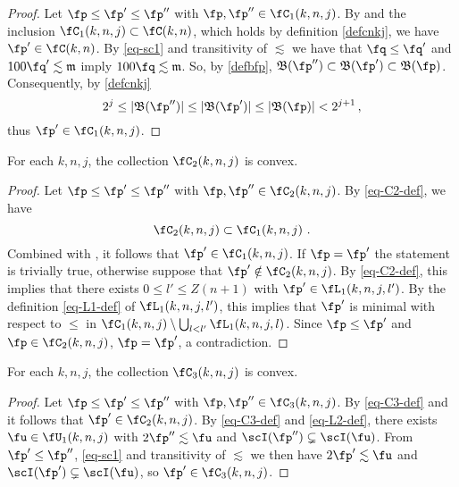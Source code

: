 \begin{proof}
    \leanok
    Let $\fp\le\fp'\le\fp''$ with $\fp, \fp'' \in \fC_1(k,n,j)$. By  and the inclusion $\fC_1(k,n,j) \subset \fC(k,n)$, which holds by definition \eqref{defcnkj}, we have $\fp' \in \fC(k,n)$. By \eqref{eq-sc1} and transitivity of $\lesssim$ we have that $\fq \le \fq'$ and $100 \fq' \lesssim \mathfrak{m}$ imply $100 \fq \lesssim \mathfrak{m}$. So, by \eqref{defbfp}, $\mathfrak{B}(\fp'') \subset \mathfrak{B}(\fp') \subset \mathfrak{B}(\fp)$. Consequently, by \eqref{defcnkj}
    $$
        2^j \le |\mathfrak{B}(\fp'')|\le |\mathfrak{B}(\fp')| \le |\mathfrak{B}(\fp)| < 2^{j+1}\,,
    $$
    thus $\fp' \in \fC_1(k,n,j)$.
\end{proof}

\begin{lemma}[C2 convex]
    \label{C2-convex}
    \leanok
    For each $k,n,j$, the collection $\fC_2(k,n,j)$ is convex.
\end{lemma}

\begin{proof}
    \leanok
     Let $\fp \le \fp' \le \fp''$ with $\fp, \fp'' \in \fC_2(k,n,j)$. By \eqref{eq-C2-def}, we have
     \begin{equation*}
         \fC_2(k,n,j) \subset \fC_1(k,n,j)\ .
     \end{equation*} Combined with , it follows that $\fp' \in \fC_1(k,n,j)$.
     If $\fp=\fp'$ the statement is trivially true, otherwise suppose that $\fp' \notin \fC_2(k,n,j)$.
     By \eqref{eq-C2-def}, this implies that there exists $0 \le l' \le Z(n+1)$ with $\fp' \in \fL_1(k,n,j,l')$.
     By the definition \eqref{eq-L1-def} of $\fL_1(k,n,j,l')$, this implies that $\fp'$ is minimal
     with respect to $\le$ in $\fC_1(k,n,j) \setminus \bigcup_{l < l'} \fL_1(k,n,j,l)$.
     Since $\fp\le\fp'$ and $\fp\in\fC_2(k,n,j)$, $\fp=\fp'$, a contradiction.
\end{proof}

\begin{lemma}[C3 convex]
    \label{C3-convex}
    \leanok
    For each $k,n,j$, the collection $\fC_3(k,n,j)$ is convex.
\end{lemma}

\begin{proof}
    \leanok
    Let $\fp \le \fp' \le \fp''$ with $\fp, \fp'' \in \fC_3(k,n,j)$.
    By \eqref{eq-C3-def} and  it follows that $\fp' \in \fC_2(k,n,j)$.
    By \eqref{eq-C3-def} and \eqref{eq-L2-def}, there exists $\fu \in \fU_1(k,n,j)$ with
    $2\fp'' \lesssim \fu$ and $\scI(\fp'') \subsetneq \scI(\fu)$. From $\fp' \le \fp''$,
    \eqref{eq-sc1} and transitivity of $\lesssim$ we then have
    $2\fp' \lesssim \fu$ and $\scI(\fp') \subsetneq \scI(\fu)$, so $\fp' \in \fC_3(k,n,j)$.
\end{proof}

